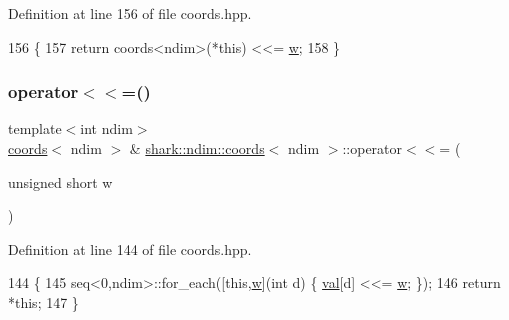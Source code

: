 Definition at line 156 of file coords.\+hpp.


\begin{DoxyCode}
156                                                                            \{
157             \textcolor{keywordflow}{return} coords<ndim>(*this) <<= \hyperlink{classshark_1_1_group_af542c8e71a81c12d6a73203ef9152d1f}{w};
158         \}
\end{DoxyCode}
\hypertarget{structshark_1_1ndim_1_1coords_ab30deb6afb13045c0cb59d90818bc122}{}\label{structshark_1_1ndim_1_1coords_ab30deb6afb13045c0cb59d90818bc122} 
\subsubsection{\texorpdfstring{operator$<$$<$=()}{operator<<=()}}
{\footnotesize\ttfamily template$<$int ndim$>$ \\
\hyperlink{structshark_1_1ndim_1_1coords}{coords}$<$ ndim $>$ \& \hyperlink{structshark_1_1ndim_1_1coords}{shark\+::ndim\+::coords}$<$ ndim $>$\+::operator$<$$<$= (\begin{DoxyParamCaption}\item[{unsigned short}]{w }\end{DoxyParamCaption})\hspace{0.3cm}{\ttfamily [inline]}}



Definition at line 144 of file coords.\+hpp.


\begin{DoxyCode}
144                                                                        \{
145             seq<0,ndim>::for\_each([\textcolor{keyword}{this},\hyperlink{classshark_1_1_group_af542c8e71a81c12d6a73203ef9152d1f}{w}](\textcolor{keywordtype}{int} d) \{ \hyperlink{structshark_1_1ndim_1_1coords_a425262af388367b0f0079218e038aef5}{val}[d] <<= \hyperlink{classshark_1_1_group_af542c8e71a81c12d6a73203ef9152d1f}{w}; \});
146             \textcolor{keywordflow}{return} *\textcolor{keyword}{this};
147         \}
\end{DoxyCode}
\hypertarget{structshark_1_1ndim_1_1coords_a0e9ca552b8eafb1f562a88935d3a3bd5}{}\label{structshark_1_1ndim_1_1coords_a0e9ca552b8eafb1f562a88935d3a3bd5} 
